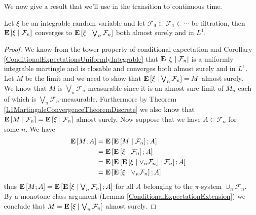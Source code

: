 We now give a result that we'll use in the transition to continuous
time.
\begin{thm}\label{JessenConditioningLimits}Let $\xi$ be an integrable
  random variable and let $\mathcal{F}_0 \subset \mathcal{F}_1 \subset
  \cdots$ be filtration, then $\cexpectationlong{\mathcal{F}_n}{\xi}$
  converges to $\cexpectationlong{\bigvee_n \mathcal{F}_n}{\xi}$ both
  almost surely and in $L^1$.
\end{thm}
\begin{proof}
We know from the tower property of conditional expectation and
Corollary \ref{ConditionalExpectationsUniformlyIntegrable} that $\cexpectationlong{\mathcal{F}_n}{\xi}$ is a
uniformly integrable martingle and is closable and converges both
almost surely and in $L^1$.  Let $M$ be the limit and we need to show
that $\cexpectationlong{\bigvee_n \mathcal{F}_n}{\xi} = M$ almost
surely.  We know that $M$ is $\bigvee_n \mathcal{F}_n$-measurable since it is an
almost sure limit of $M_n$ each of which is $\bigvee_n
\mathcal{F}_n$-measurable.  Furthermore by Theorem
\ref{L1MartingaleConvergenceTheoremDiscrete} we also know that
$\cexpectationlong{\mathcal{F}_n}{M} =
\cexpectationlong{\mathcal{F}_n}{\xi}$ almost surely.  Now suppose
that we have $A \in \mathcal{F}_n$ for some $n$.  We have
\begin{align*}
\expectation{M ; A} &=
\expectation{\cexpectationlong{\mathcal{F}_n}{M} ; A} \\
&=\expectation{\cexpectationlong{\mathcal{F}_n}{\xi} ; A} \\
&=\expectation{\cexpectationlong{\mathcal{F}_n}{\cexpectationlong{\vee_n
      \mathcal{F}_n}{\xi}} ; A} \\
&=\expectation{\cexpectationlong{\vee_n
      \mathcal{F}_n}{\xi} ; A} \\
\end{align*}
thus $\expectation{M ; A}  = \expectation{\cexpectationlong{\bigvee_n
    \mathcal{F}_n}{\xi} ; A}$ for all $A$ belonging to the
$\pi$-system $\cup_n \mathcal{F}_n$.  By a monotone class argument
(Lemma \ref{ConditionalExpectationExtension}) we conclude that $M = \cexpectationlong{\bigvee_n
    \mathcal{F}_n}{\xi}$ almost surely.
\end{proof}

